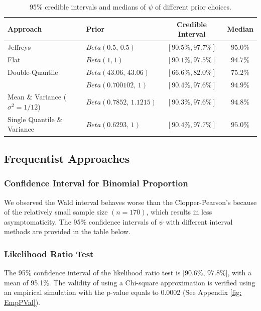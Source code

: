 \documentclass[12pt]{amsart}
\begin{document}
\singlespacing
\begin{table}[H]
  \begin{center}
  \setlength{\tabcolsep}{10pt} %
\renewcommand{\arraystretch}{1.1}
    \begin{tabular}{ l l c c }
     Approach & Prior & Credible Interval & Median \\ \hline
     Jeffreys & $Beta(0.5, \, 0.5)$& $[90.5\%, 97.7\%]$ & $95.0\%$ \\ 
     Flat & $Beta(1, 1)$ & $[90.1\%, 97.5\%]$ & $94.7\%$ \\ 
     Double-Quantile & $Beta(43.06, \, 43.06)$ &  $[66.6\%, 82.0\%]$ & $75.2\%$ \\
     \cite{paper} & $Beta(0.700102, \, 1)$ & $[90.4\%, 97.6\%]$ & $94.9\%$ \\
     Mean \& Variance ($\sigma^2 = 1/12$) & $Beta(0.7852, \, 1.1215)$ & $[90.3\%, 97.6\%]$ & $94.8\%$ \\
     Single Quantile \& Variance & $Beta(0.6293, \, 1)$ & $[90.4\%, 97.7\%]$ & $95.0\%$ \\ \hline
    \end{tabular}
    \vspace{5pt}
    \caption{95\% credible intervals and medians of $\psi$ of different prior choices.} \label{table:1}
  \end{center}
\end{table}
\doublespacing
\subsection{Frequentist Approaches}
\subsubsection{Confidence Interval for Binomial Proportion}
We observed the Wald interval behaves worse than the Clopper-Pearson's because of the relatively small sample size $(n = 170)$, which results in less asymptomaticity. The 95\% confidence intervals of $\psi$ with different interval methods are provided in the table below.
\subsubsection{Likelihood Ratio Test}
The 95\% confidence interval of the likelihood ratio test is [90.6\%, 97.8\%], with a mean of 95.1\%. The validity of using a Chi-square approximation is verified using an empirical simulation with the p-value equals to 0.0002 (See Appendix \ref{fig: EmpPVal}).
\end{document}
